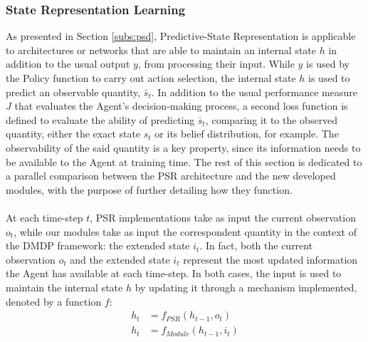             \subsubsection{State Representation Learning}
                As presented in Section \ref{subs:psd}, Predictive-State Representation is applicable to architectures or networks that are able to maintain an internal state $h$ in addition to the usual output $y$, from processing their input. While $y$ is used by the Policy function to carry out action selection, the internal state $h$ is used to predict an observable quantity, $\bar{s}_t$. In addition to the usual performance measure $J$ that evaluates the Agent's decision-making process, a second loss function is defined to evaluate the ability of predicting $\bar{s}_t$, comparing it to the observed quantity, either the exact state $s_t$ or its belief distribution, for example. The observability of the said quantity is a key property, since its information needs to be available to the Agent at training time. The rest of this section is dedicated to a parallel comparison between the PSR architecture and the new developed modules, with the purpose of further detailing how they function.
                \\\\
                At each time-step $t$, PSR implementations take as input the current observation $o_t$, while our modules take as input the correspondent quantity in the context of the DMDP framework: the extended state $i_t$. In fact, both the current observation $o_t$ and the extended state $i_t$ represent the most updated information the Agent has available at each time-step. \newline
                In both cases, the input is used to maintain the internal state $h$ by updating it through a mechanism implemented, denoted by a function $f$:
                \begin{align*}
                    h_t &= f_{PSR}(h_{t-1}, o_t)\\
                    h_t &= f_{Module}(h_{t-1}, i_t)
                \end{align*}
